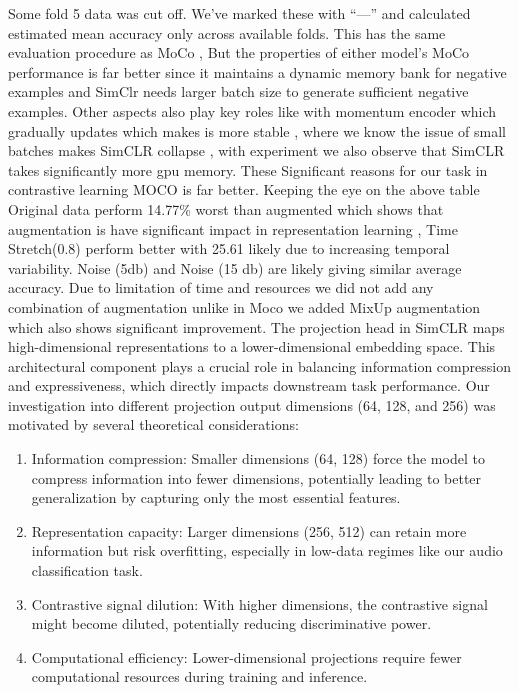 \documentclass[11pt]{article}
\begin{document}
Some fold 5 data was cut off. We’ve marked these with “—” and calculated estimated mean accuracy only across available folds. This has the same evaluation procedure as MoCo , But the properties of either model's MoCo performance is far better since it maintains a dynamic memory bank for negative examples and SimClr needs larger batch size to generate sufficient negative examples. Other aspects also play key roles like with momentum encoder which gradually updates which makes is more stable , where we know the issue of small batches makes SimCLR collapse , with experiment we also observe that SimCLR takes significantly more gpu memory. These Significant reasons for our task in contrastive learning MOCO is far better. Keeping the eye on the above table Original data perform 14.77\% worst than augmented which shows that augmentation is have significant impact in representation learning , Time Stretch(0.8) perform better with 25.61 likely due to increasing temporal variability. Noise (5db) and Noise (15 db) are likely giving similar average accuracy. Due to limitation of time and resources we did not add any combination of augmentation unlike in Moco we added MixUp augmentation which also shows significant improvement.
The projection head in SimCLR maps high-dimensional representations to a lower-dimensional embedding space. This architectural component plays a crucial role in balancing information compression and expressiveness, which directly impacts downstream task performance.
Our investigation into different projection output dimensions (64, 128, and 256) was motivated by several theoretical considerations:
\begin{enumerate}
    \item Information compression: Smaller dimensions (64, 128) force the model to compress information into fewer dimensions, potentially leading to better generalization by capturing only the most essential features.
    \item Representation capacity: Larger dimensions (256, 512) can retain more information but risk overfitting, especially in low-data regimes like our audio classification task.
    \item Contrastive signal dilution: With higher dimensions, the contrastive signal might become diluted, potentially reducing discriminative power.
    \item Computational efficiency: Lower-dimensional projections require fewer computational resources during training and inference.
\end{enumerate}
\end{document}
